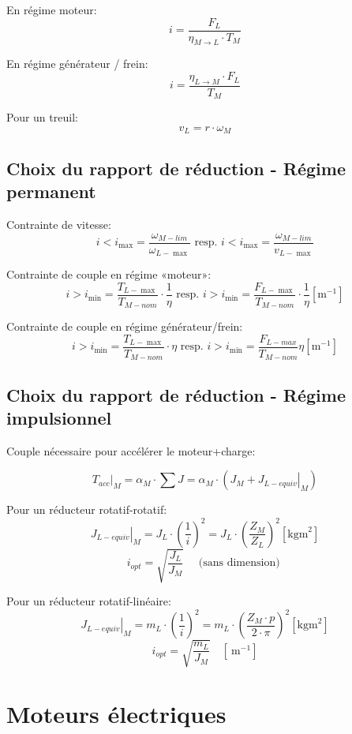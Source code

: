 \documentclass[10pt]{article} %
\begin{document}
\begin{multicols}{3}
			En régime moteur:
			\[i = \frac{F_L}{\eta_{M \rightarrow L} \cdot T_M} \]
			
			En régime générateur / frein:
			\[i = \frac{\eta_{L \rightarrow M} \cdot F_L}{T_M} \]
			
			Pour un treuil:
			\[v_L = r \cdot \omega_M \]

		\subsection*{Choix du rapport de réduction - Régime permanent}
	
			Contrainte de vitesse:
			\[i<i_{\max }=\frac{\omega_{M-l i m}}{\omega_{L-\max }} \text{ resp. } i<i_{\max }=\frac{\omega_{M-l i m}}{v_{L-\max }}\]
			
			Contrainte de couple en régime «moteur»:
			\[i>i_{\min }=\frac{T_{L-\max }}{T_{M-n o m}} \cdot \frac{1}{\eta} \text{ resp. } i>i_{\min }=\frac{F_{L-\max }}{T_{M-n o m}} \cdot \frac{1}{\eta}\left[\mathrm{m}^{-1}\right]\]
			
			Contrainte de couple en régime générateur/frein:
			\[i>i_{\min }=\frac{T_{L-\max }}{T_{M-n o m}} \cdot \eta \text{ resp. } i>i_{\min }=\frac{F_{L-m a x}}{T_{M-n o m}} \eta\left[\mathrm{m}^{-1}\right]\]
		
		\subsection*{Choix du rapport de réduction - Régime impulsionnel}
			
			Couple nécessaire pour accélérer le moteur+charge:
			
			\[\left.T_{a c c}\right|_{M}=\alpha_{M} \cdot \sum J=\alpha_{M} \cdot\left(J_{M}+\left.J_{L-equiv}\right|_{M}\right)\]
			
			Pour un réducteur rotatif-rotatif:
			\[\left.J_{L-equiv}\right|_{M}=J_{L} \cdot\left(\frac{1}{i}\right)^{2}=J_{L} \cdot\left(\frac{Z_{M}}{Z_{L}}\right)^{2}\left[\mathrm{kgm}^{2}\right]\]
			\[i_{o p t}=\sqrt{\frac{J_{L}}{J_{M}}} \quad \text { (sans dimension) }\]
			
			Pour un réducteur rotatif-linéaire:
			\[\left.J_{L-equiv}\right|_{M}=m_{L} \cdot\left(\frac{1}{i}\right)^{2}=m_{L} \cdot\left(\frac{Z_{M} \cdot p}{2 \cdot \pi}\right)^{2}\left[\mathrm{kgm}^{2}\right]\]
			\[i_{o p t}=\sqrt{\frac{m_{L}}{J_{M}}} \quad\left[\mathrm{~m}^{-1}\right]\]

	\section*{Moteurs électriques}
	

\end{multicols}
\end{document}

